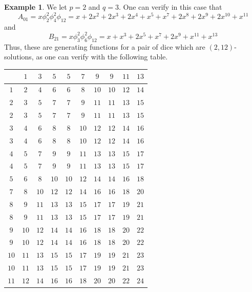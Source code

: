 \documentclass[11pt]{amsart}
\numberwithin{equation}{section}
\theoremstyle{plain}
\theoremstyle{definition}
\newtheorem{example}[equation]{Example}
\begin{document}
\begin{example}
We let $p=2$ and $q=3$. One can verify in this case that 
\[A_{01}=x\phi_2^2\phi_{4}^2\phi_{12}=x + 2 x^2 + 2 x^3 + 2 x^4 + x^5 + x^7 + 2 x^8 + 2 x^9 + 2 x^{10} + x^{11}\]
and 
\[B_{21}=x\phi_3^2\phi_{6}^2\phi_{12}=x + x^3 + 2 x^5 + x^7 + 2 x^9 + x^{11} + x^{13} \]
Thus, these are generating functions for a pair of dice which are $(2,12)$-solutions, as one can verify with the following table. 


\begin{center}
\begin{tabular}{c|ccccccccc}
 & $1$ & $3$ & $5$ & $5$ & $7$ & $9$ & $9$ & $11$ & $13$ \\
\hline
$1$  & $2$  & $4$  & $6$  & $6$  & $8$  & $10$ & $10$ & $12$ & $14$ \\
$2$  & $3$  & $5$  & $7$  & $7$  & $9$  & $11$ & $11$ & $13$ & $15$ \\
$2$  & $3$  & $5$  & $7$  & $7$  & $9$  & $11$ & $11$ & $13$ & $15$ \\
$3$  & $4$  & $6$  & $8$  & $8$  & $10$ & $12$ & $12$ & $14$ & $16$ \\
$3$  & $4$  & $6$  & $8$  & $8$  & $10$ & $12$ & $12$ & $14$ & $16$ \\
$4$  & $5$  & $7$  & $9$  & $9$  & $11$ & $13$ & $13$ & $15$ & $17$ \\
$4$  & $5$  & $7$  & $9$  & $9$  & $11$ & $13$ & $13$ & $15$ & $17$ \\
$5$  & $6$  & $8$  & $10$ & $10$ & $12$ & $14$ & $14$ & $16$ & $18$ \\
$7$  & $8$  & $10$ & $12$ & $12$ & $14$ & $16$ & $16$ & $18$ & $20$ \\
$8$  & $9$  & $11$ & $13$ & $13$ & $15$ & $17$ & $17$ & $19$ & $21$ \\
$8$  & $9$  & $11$ & $13$ & $13$ & $15$ & $17$ & $17$ & $19$ & $21$ \\
$9$  & $10$ & $12$ & $14$ & $14$ & $16$ & $18$ & $18$ & $20$ & $22$ \\
$9$  & $10$ & $12$ & $14$ & $14$ & $16$ & $18$ & $18$ & $20$ & $22$ \\
$10$ & $11$ & $13$ & $15$ & $15$ & $17$ & $19$ & $19$ & $21$ & $23$ \\
$10$ & $11$ & $13$ & $15$ & $15$ & $17$ & $19$ & $19$ & $21$ & $23$ \\
$11$ & $12$ & $14$ & $16$ & $16$ & $18$ & $20$ & $20$ & $22$ & $24$
\end{tabular}
\end{center}
\end{example}
\end{document}
